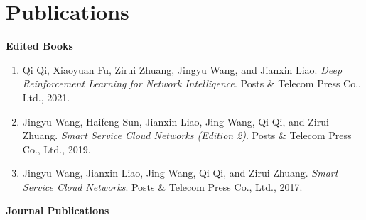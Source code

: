 \documentclass[letterpaper,11pt]{article}
\newcommand{\contentlength}{5.25in} %
\begin{document}
	\section{\textbf{Publications}}
	\begin{tcolorbox}[flush right,breakable,colback=white,colframe=white,width=\contentlength]
		\textbf{Edited Books}
		\begin{enumerate}[itemsep=0mm]
			\item Qi Qi, Xiaoyuan Fu, Zirui Zhuang, Jingyu Wang, and Jianxin Liao. \textit{Deep Reinforcement Learning for Network Intelligence}. Posts \& Telecom Press Co., Ltd., 2021.
			\item Jingyu Wang, Haifeng Sun, Jianxin Liao, Jing Wang, Qi Qi, and Zirui Zhuang. \textit{Smart Service Cloud Networks (Edition 2)}. Posts \& Telecom Press Co., Ltd., 2019.
			\item Jingyu Wang, Jianxin Liao, Jing Wang, Qi Qi, and Zirui Zhuang. \textit{Smart Service Cloud Networks}. Posts \& Telecom Press Co., Ltd., 2017.
		\end{enumerate}
	
		\textbf{Journal Publications}
		

\end{tcolorbox}
\end{document}
